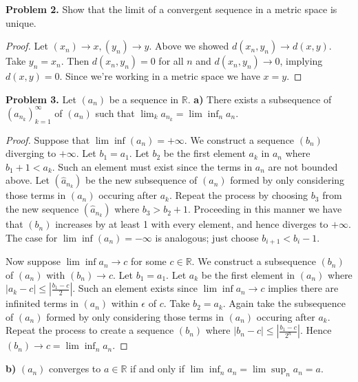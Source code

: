 \documentclass[12pt]{article}
\begin{document}

\textbf{Problem 2.}
Show that the limit of a convergent sequence in a metric space is unique.
\begin{proof}
Let $(x_n) \rightarrow x, (y_n) \rightarrow y$. Above we showed $d(x_n,
y_n) \rightarrow d(x, y)$. Take $y_n = x_n$. Then $d(x_n, y_n) = 0$ for all
$n$ and $d(x_n, y_n) \rightarrow 0$, implying $d(x, y) = 0$. Since we're
working in a metric space we have $x = y$.
\end{proof}


\textbf{Problem 3.}
Let $(a_n)$ be a sequence in $\mathbb{R}$.
\textbf{a)}
There exists a subsequence of $(a_{n_k})_{k=1}^{\infty}$ of $(a_n)$
such that $\lim_k a_{n_k} = \lim \inf_n a_n$.
\begin{proof}
Suppose that $\lim \inf (a_n) = +\infty$. We construct a sequence $(b_n)$
diverging to $+ \infty$. Let $b_1 = a_1$. Let $b_2$ be the first element
$a_k$ in $a_n$ where $b_1 + 1 < a_k$. Such an element must exist since the
terms in $a_n$ are not bounded above. Let $(\hat{a}_{n_k})$ be the new
subsequence of $(a_n)$ formed by only considering those terms in $(a_n)$
occuring after $a_k$. Repeat the process by choosing $b_3$ from the new
sequence $(\hat{a}_{n_k})$ where $b_3 > b_2 + 1$. Proceeding in this manner
we have that $(b_n)$ increases by at least 1 with every element, and hence
diverges to $+ \infty$. The case for $\lim \inf (a_n) = -\infty$ is
analogous; just choose $b_{i + 1} < b_{i} - 1$. 

Now suppose $\lim \inf a_n \rightarrow c$ for some $c \in \mathbb{R}$. We
construct a subsequence $(b_n)$ of $(a_n)$ with $(b_n) \rightarrow c$. Let
$b_1 = a_1$. Let $a_k$ be the first element in $(a_n)$ where $|a_k - c|
\leq |\frac{b_1 - c}{2}|$. Such an element exists since $\lim \inf a_n
\rightarrow c$ implies there are infinited terms in $(a_n)$ within
$\epsilon$
of $c$. Take $b_2 = a_k$. Again take the
subsequence of $(a_n)$ formed by only considering those terms in $(a_n)$
occuring after $a_k$. Repeat the process to create a sequence $(b_n)$ 
where $| b_n - c| \leq | \frac{b_1 - c}{2^n}|$. Hence $(b_n) \rightarrow c= \lim \inf_n a_n$.

\end{proof}

\textbf{b)}
$(a_n)$ converges to $a \in \mathbb{R}$ if and only if $\lim \inf_n a_n =
\lim \sup_n a_n = a$.
\end{document}
